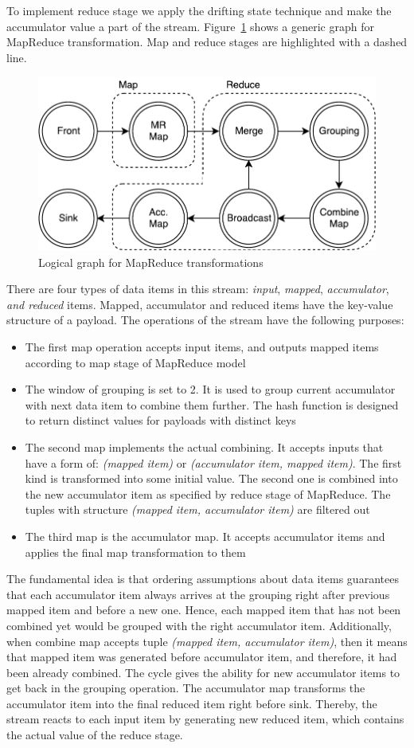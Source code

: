 To implement reduce stage we apply the drifting state technique and make the accumulator value a part of the stream. Figure~\ref{mapreduce-graph-figure} shows a generic graph for MapReduce transformation. Map and reduce stages are highlighted with a dashed line. 

\begin{figure}[ht]
  \centering
  \includegraphics[width=.5\textwidth]{pics/mapreduce}
  \caption{Logical graph for MapReduce transformations}
  \label {mapreduce-graph-figure}
\end{figure}

There are four types of data items in this stream: {\it input}, {\it mapped}, {\it accumulator}, {\it and reduced} items. Mapped, accumulator and reduced items have the key-value structure of a payload. The operations of the stream have the following purposes:

\begin{itemize}
  \item The first map operation accepts input items, and outputs mapped items according to map stage of MapReduce model
  \item The window of grouping is set to 2. It is used to group current accumulator with next data item to combine them further. The hash function is designed to return distinct values for payloads with distinct keys
  \item The second map implements the actual combining. It accepts inputs that have a form of: \textit{(mapped item)} or \textit{(accumulator item, mapped item)}. The first kind is transformed into some initial value. The second one is combined into the new accumulator item as specified by reduce stage of MapReduce. The tuples with structure \textit{(mapped item, accumulator item)} are filtered out
  \item The third map is the accumulator map. It accepts accumulator items and applies the final map transformation to them
\end{itemize}

The fundamental idea is that ordering assumptions about data items guarantees that each accumulator item always arrives at the grouping right after previous mapped item and before a new one. Hence, each mapped item that has not been combined yet would be grouped with the right accumulator item. Additionally, when combine map accepts tuple {\it (mapped item, accumulator item)}, then it means that mapped item was generated before accumulator item, and therefore, it had been already combined. The cycle gives the ability for new accumulator items to get back in the grouping operation. The accumulator map transforms the accumulator item into the final reduced item right before sink. Thereby, the stream reacts to each input item by generating new reduced item, which contains the actual value of the reduce stage.

